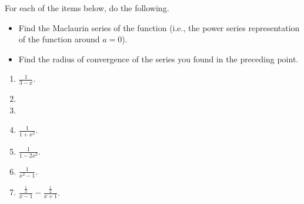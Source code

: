 For each of the items below, do the following.
\begin{itemize}
\item Find the Maclaurin series of the function (i.e., the power series representation of the function around $a=0$).
\item Find the radius of convergence of the series you found in the preceding point. 
\end{itemize}
\begin{multicols}{2}
\begin{enumerate}[ref={\fcProblemRef}]
\item $\displaystyle \frac{1}{3-x}$.

\item 
\item 
\item $\displaystyle \frac{1}{1+x^2}$.

\item $\displaystyle \frac{1}{1-2x^2}$.

\item \label{problemMaclaurin(1/(x^2-1))} $\displaystyle \frac{1}{x^2-1}$. 

\item $\displaystyle\frac{\frac12}{x-1}-\frac{\frac12}{x+1}$.


\end{enumerate}
\end{multicols}

